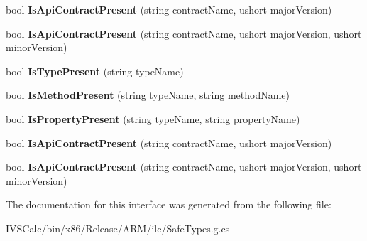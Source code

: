 \begin{DoxyCompactItemize}
bool {\bfseries Is\+Api\+Contract\+Present} (string contract\+Name, ushort major\+Version)
\item 
\mbox{\label{interface_windows_1_1_foundation_1_1_metadata_1_1_i_api_information_statics_abd1e942e837a914ecc123132f440c117}} 
bool {\bfseries Is\+Api\+Contract\+Present} (string contract\+Name, ushort major\+Version, ushort minor\+Version)
\item 
\mbox{\label{interface_windows_1_1_foundation_1_1_metadata_1_1_i_api_information_statics_a624a3c7f88248db447de8e71c6d40969}} 
bool {\bfseries Is\+Type\+Present} (string type\+Name)
\item 
\mbox{\label{interface_windows_1_1_foundation_1_1_metadata_1_1_i_api_information_statics_a551de0a63c04169be958fc08bb53e498}} 
bool {\bfseries Is\+Method\+Present} (string type\+Name, string method\+Name)
\item 
\mbox{\label{interface_windows_1_1_foundation_1_1_metadata_1_1_i_api_information_statics_aca08751223a05e1bef2211bddbfc48b3}} 
bool {\bfseries Is\+Property\+Present} (string type\+Name, string property\+Name)
\item 
\mbox{\label{interface_windows_1_1_foundation_1_1_metadata_1_1_i_api_information_statics_a7fca31115e40e05294977921f9cbf369}} 
bool {\bfseries Is\+Api\+Contract\+Present} (string contract\+Name, ushort major\+Version)
\item 
\mbox{\label{interface_windows_1_1_foundation_1_1_metadata_1_1_i_api_information_statics_abd1e942e837a914ecc123132f440c117}} 
bool {\bfseries Is\+Api\+Contract\+Present} (string contract\+Name, ushort major\+Version, ushort minor\+Version)
\end{DoxyCompactItemize}


The documentation for this interface was generated from the following file\+:\begin{DoxyCompactItemize}
\item 
I\+V\+S\+Calc/bin/x86/\+Release/\+A\+R\+M/ilc/Safe\+Types.\+g.\+cs\end{DoxyCompactItemize}
